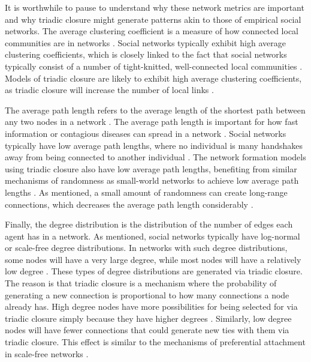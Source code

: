 \documentclass[11pt]{article}
\begin{document}
\noindent It is worthwhile to pause to understand why these network metrics are important and why triadic closure might generate patterns akin to those of empirical social networks. The average clustering coefficient is a measure of how connected local communities are in networks \cite{watts_collective_1998}. Social networks typically exhibit high average clustering coefficients, which is closely linked to the fact that social networks typically consist of a number of tight-knitted, well-connected local communities \cite{peixoto_disentangling_2022, newman_finding_2006, crandall_feedback_2008}. Models of triadic closure are likely to exhibit high average clustering coefficients, as triadic closure will increase the number of local links \cite{jacksonmeeting2007}. 

The average path length refers to the average length of the shortest path between any two nodes in a network \cite{watts_collective_1998}. The average path length is important for how fast information or contagious diseases can spread in a network \cite{cowan2004network}. Social networks typically have low average path lengths, where no individual is many handshakes away from being connected to another individual \cite{backstrom2012four}. The network formation models using triadic closure also have low average path lengths, benefiting from similar mechanisms of randomness as small-world networks to achieve low average path lengths \cite{jacksonmeeting2007,watts_collective_1998}. As mentioned, a small amount of randomness can create long-range connections, which decreases the average path length considerably \cite{watts_networks_1999}.  

Finally, the degree distribution is the distribution of the number of edges each agent has in a network. As mentioned, social networks typically have log-normal or scale-free degree distributions. In networks with such degree distributions, some nodes will have a very large degree, while most nodes will have a relatively low degree \cite{bianconi_triadic_2014}. These types of degree distributions are generated via triadic closure. The reason is that triadic closure is a mechanism where the probability of generating a new connection is proportional to how many connections a node already has. High degree nodes have more possibilities for being selected for via triadic closure simply because they have higher degrees \cite{jacksonmeeting2007}. Similarly, low degree nodes will have fewer connections that could generate new ties with them via triadic closure. This effect is similar to the mechanisms of preferential attachment in scale-free networks \cite{barabasi_scale-free_2003}.
\end{document}
